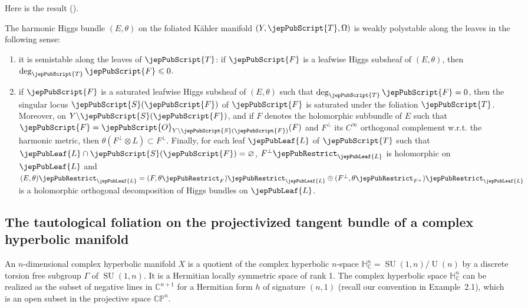 Here is the result (\cite[Prop.~2.2]{jep93KM17}).
\begin{proposition}
The harmonic Higgs bundle $(E,\theta)$ on the foliated Kähler manifold $(Y,\jepPubScript{T},\Omega)$ is weakly polystable along the leaves in the following sense:
\begin{enumerate}[label=(\arabic*)]
\item it is semistable along the leaves of $\jepPubScript{T}$: if $\jepPubScript{F}$ is a leafwise Higgs subsheaf of $(E,\theta)$, then $\deg_{\jepPubScript{T}}\jepPubScript{F}\leqslant0$.
\item if $\jepPubScript{F}$ is a saturated leafwise Higgs subsheaf of $(E,\theta)$ such that $\deg_{\jepPubScript{T}}\jepPubScript{F}=0$, then the singular locus $\jepPubScript{S}(\jepPubScript{F})$ of $\jepPubScript{F}$ is saturated under the foliation $\jepPubScript{T}$. Moreover, on $Y\backslash\jepPubScript{S}(\jepPubScript{F})$, and if $F$ denotes the holomorphic subbundle of $E$ such that $\jepPubScript{F}=\jepPubScript{O}_{Y\backslash\jepPubScript{S}(\jepPubScript{F})}(F)$ and $F^\perp$ its $C^\infty$ orthogonal complement w.r.t. the harmonic metric, then $\theta(F^\perp\otimes L)\subset F^\perp$. Finally, for each leaf $\jepPubLeaf{L}$ of $\jepPubScript{T}$ such that $\jepPubLeaf{L}\cap\jepPubScript{S}(\jepPubScript{F})=\varnothing$, $F^\perp\jepPubRestrict_{\jepPubLeaf{L}}$ is holomorphic on $\jepPubLeaf{L}$ and $(E,\theta)\jepPubRestrict_{\jepPubLeaf{L}}=(F,\theta\jepPubRestrict_F)\jepPubRestrict_{\jepPubLeaf{L}}\oplus(F^\perp,\theta\jepPubRestrict_{F^\perp})\jepPubRestrict_{\jepPubLeaf{L}}$ is a holomorphic orthogonal decomposition of Higgs bundles on $\jepPubLeaf{L}$.
\end{enumerate}
\end{proposition}
\subsection{The tautological foliation on the projectivized tangent bundle of a complex hyperbolic manifold}
An $n$-dimensional complex hyperbolic manifold $X$ is a quotient of the complex hyperbolic $n$-space $\mathbb H^n_{\mathbb C}=\operatorname{SU}(1,n)/\operatorname U(n)$ by a discrete torsion free subgroup $\Gamma$ of $\operatorname{SU}(1,n)$. It is a Hermitian locally symmetric space of rank 1. The complex hyperbolic space $\mathbb H^n_{\mathbb C}$ can be realized as the subset of negative lines in $\mathbb C^{n+1}$ for a Hermitian form $h$ of signature $(n,1)$ (recall our convention in Example~2.1), which is an open subset in the projective space $\mathbb{CP}^n$.

